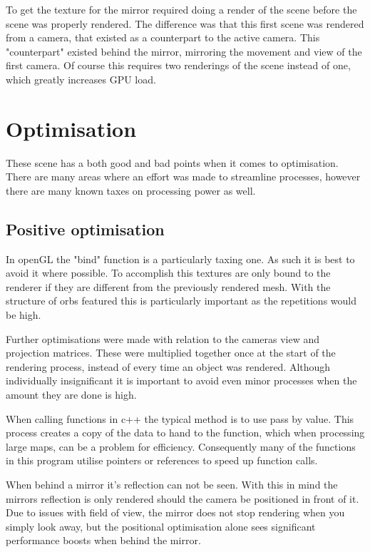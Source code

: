 \documentclass[10pt, a4paper]{article}
\begin{document}
	To get the texture for the mirror required doing a render of the scene before the scene was properly rendered.  The difference was that this first scene was rendered from a camera, that existed as a counterpart to the active camera.  This "counterpart" existed behind the mirror, mirroring the movement and view of the first camera.  Of course this requires two renderings of the scene instead of one, which greatly increases GPU load.
	
	\section{Optimisation}
	These scene has a both good and bad points when it comes to optimisation.  There are many areas where an effort was made to streamline processes, however there are many known taxes on processing power as well.
	
	\subsection{Positive optimisation}
	In openGL the "bind" function is a particularly taxing one.  As such it is best to avoid it where possible.  To accomplish this textures are only bound to the renderer if they are different from the previously rendered mesh.  With the structure of orbs featured this is particularly important as the repetitions would be high.
	
	Further optimisations were made with relation to the cameras view and projection matrices.  These were multiplied together once at the start of the rendering process, instead of every time an object was rendered.  Although individually insignificant it is important to avoid even minor processes when the amount they are done is high.
	
	When calling functions in c++ the typical method is to use pass by value.  This process creates a copy of the data to hand to the function, which when processing large maps, can be a problem for efficiency.  Consequently many of the functions in this program utilise pointers or references to speed up function calls.
	
	When behind a mirror it's reflection can not be seen.  With this in mind the mirrors reflection is only rendered should the camera be positioned in front of it.  Due to issues with field of view, the mirror does not stop rendering when you simply look away, but the positional optimisation alone sees significant performance boosts when behind the mirror.
	
\end{document}
